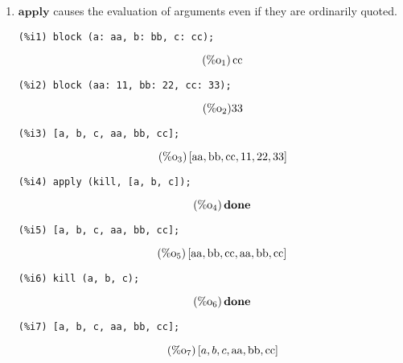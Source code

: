 \documentclass[12pt,leqno]{article}
\begin{document}
\begin{enumerate}
\item $\mathbf{apply}$ causes the evaluation of arguments even if they are ordinarily quoted.
\begin{verbatim}
(%i1) block (a: aa, b: bb, c: cc);
\end{verbatim}
\begin{equation}
\tag{$\mathop{\mathrm{\%o}_{1}}$}\mathop{\mathrm{cc}}
\label{eq:doc-group1-code19-1-1}
\end{equation}
\begin{verbatim}
(%i2) block (aa: 11, bb: 22, cc: 33);
\end{verbatim}
\begin{equation}
\tag{$\mathop{\mathrm{\%o}_{2}}$}33
\label{eq:doc-group1-code19-2-1}
\end{equation}
\begin{verbatim}
(%i3) [a, b, c, aa, bb, cc];
\end{verbatim}
\begin{equation}
\tag{$\mathop{\mathrm{\%o}_{3}}$}\left[\mathop{\mathrm{aa}}, \mathop{\mathrm{bb}}, \mathop{\mathrm{cc}}, 11, 22, 33\right]
\label{eq:doc-group1-code19-3-1}
\end{equation}
\begin{verbatim}
(%i4) apply (kill, [a, b, c]);
\end{verbatim}
\begin{equation}
\tag{$\mathop{\mathrm{\%o}_{4}}$}\mathop{\mathbf{done}}
\label{eq:doc-group1-code19-4-1}
\end{equation}
\begin{verbatim}
(%i5) [a, b, c, aa, bb, cc];
\end{verbatim}
\begin{equation}
\tag{$\mathop{\mathrm{\%o}_{5}}$}\left[\mathop{\mathrm{aa}}, \mathop{\mathrm{bb}}, \mathop{\mathrm{cc}}, \mathop{\mathrm{aa}}, \mathop{\mathrm{bb}}, \mathop{\mathrm{cc}}\right]
\label{eq:doc-group1-code19-5-1}
\end{equation}
\begin{verbatim}
(%i6) kill (a, b, c);
\end{verbatim}
\begin{equation}
\tag{$\mathop{\mathrm{\%o}_{6}}$}\mathop{\mathbf{done}}
\label{eq:doc-group1-code19-6-1}
\end{equation}
\begin{verbatim}
(%i7) [a, b, c, aa, bb, cc];
\end{verbatim}
\begin{equation}
\tag{$\mathop{\mathrm{\%o}_{7}}$}\left[a, b, c, \mathop{\mathrm{aa}}, \mathop{\mathrm{bb}}, \mathop{\mathrm{cc}}\right]
\label{eq:doc-group1-code19-7-1}
\end{equation}



\end{enumerate}
\end{document}
